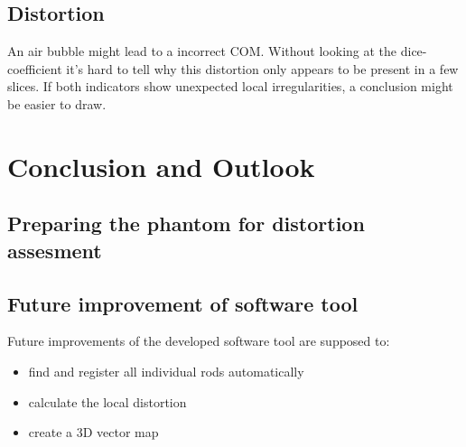 \documentclass[parskip,bibtotoc,final,twoside=false,titlepage,a4paper,english,12pt,titlepage,a4paper]{scrbook}
\begin{document}
\section{Distortion}
An air bubble might lead to a incorrect COM. Without looking at the dice-coefficient it's hard to tell why this distortion only appears to be present in a few slices.
If both indicators show unexpected local irregularities, a conclusion might be easier to draw.

\chapter{Conclusion and Outlook}

\section{Preparing the phantom for distortion assesment}

\section{Future improvement of software tool}

Future improvements of the developed software tool are supposed to:
\begin{itemize}
 \item find and register all individual rods automatically
 \item calculate the local distortion
 \item create a 3D vector map
\end{itemize}




\end{document}
